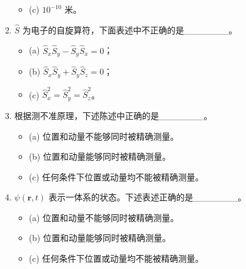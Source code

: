 \begin{enumerate}
\begin{itemize}
    \item (c) $10^{-10}$ 米。
\end{itemize}
    \item $\hat{S}$ 为电子的自旋算符，下面表述中不正确的是_______。  
    \begin{itemize}
    \item (a) $\hat{S}_x \hat{S}_y - \hat{S}_y \hat{S}_x = 0$；
    \item (b) $\hat{S}_x \hat{S}_y + \hat{S}_y \hat{S}_z = 0$；
    \item (c) $\hat{S}_x^2 = \hat{S}_y^2 = \hat{S}_z^2$。
\end{itemize}
    \item 根据测不准原理，下述陈述中正确的是_______。 
    \begin{itemize}
    \item (a) 位置和动量不能够同时被精确测量。
    \item (b) 位置和动量能够同时被精确测量。
    \item (c) 任何条件下位置或动量均不能被精确测量。
\end{itemize}
    \item $\psi(\mathbf{r}, t)$ 表示一体系的状态。下述表述正确的是_______。
    \begin{itemize}
    \item (a) 位置和动量不能够同时被精确测量。
    \item (b) 位置和动量能够同时被精确测量。
    \item (c) 任何条件下位置或动量均不能被精确测量。
\end{itemize}
\end{enumerate}


